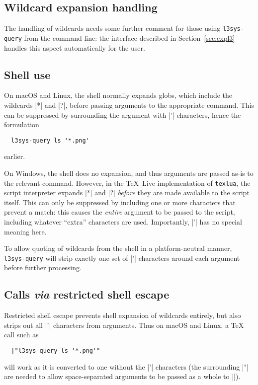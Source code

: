 \documentclass{l3doc}
\begin{document}
\begin{documentation}
\section{Wildcard expansion handling\label{sec:wildcard}}

The handling of wildcards needs some further comment for those using
\texttt{l3sys-query} from the command line: the  interface described
in Section~\ref{sec:expl3} handles this aspect automatically for the user.

\subsection{Shell use}

On macOS and Linux, the shell normally expands globs, which include the
wildcards |*| and |?|, before passing arguments to the appropriate command. This
can be suppressed by surrounding the argument with |'| characters, hence the
formulation
\begin{verbatim}
  l3sys-query ls '*.png'
\end{verbatim}
earlier.

On Windows, the shell does no expansion, and thus arguments are passed as-is to
the relevant command. However, in the \TeX{}~Live implementation of
\texttt{texlua}, the script interpreter expands |*| and |?| \emph{before} they
are made available to the script itself. This can only be suppressed by
including one or more characters that prevent a match: this causes the
\emph{entire} argument to be passed to the script, including whatever
\enquote{extra} characters are used. Importantly, |'| has no special meaning
here.

To allow quoting of wildcards from the shell in a platform-neutral manner,
\texttt{l3sys-query} will strip exactly one set of |'| characters around
each argument before further processing.

\subsection{Calls \emph{via} restricted shell escape}

Restricted shell escape prevents shell expansion of wildcards entirely, but
also strips out all |'| characters from arguments. Thus on macOS and
Linux, a \TeX{} call such as
\begin{verbatim}
  |"l3sys-query ls '*.png'"
\end{verbatim}
will work as it is converted to one without the |'| characters (the surrounding
|"| are needed to allow space-separated arguments to be passed as a whole to
||).


\end{documentation}
\end{document}
